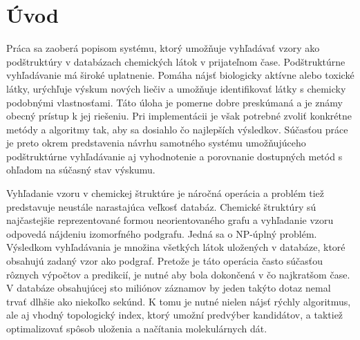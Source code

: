 \documentclass[slovak]{ExcelAtFIT} %
\affiliation{*%
  \href{mailto:xsevci50@stud.fit.vutbr.cz}{xsevci50@stud.fit.vutbr.cz},
  \textit{Faculty of Information Technology, Brno University of Technology}}
\begin{document}
\startdocument



\section{Úvod}
Práca sa zaoberá popisom systému, ktorý umožňuje vyhľadávať vzory ako podštruktúry v databázach chemických látok v prijateľnom čase. Podštruktúrne vy\-hľa\-dá\-va\-nie má široké uplatnenie. Pomáha nájsť biologicky aktívne alebo toxické látky, urýchľuje výskum nových liečiv a umožňuje identifikovať látky s chemicky podobnými vlastnosťami. Táto úloha je pomerne dobre preskúmaná a je známy obecný prístup k jej riešeniu. Pri implementácii je však potrebné zvoliť konkrétne metódy a algoritmy tak, aby sa dosiahlo čo najlepších výsledkov. Súčasťou práce je preto okrem predstavenia návrhu samotného systému umožňujúceho podštruktúrne vy\-hľa\-dá\-va\-nie aj vyhodnotenie a porovnanie dostupných metód s ohľadom na súčasný stav výskumu.

Vyhľadanie vzoru v chemickej štruktúre je náročná operácia a problém tiež predstavuje neustále narastajúca veľkosť databáz. Chemické štruktúry sú najčastejšie reprezentované formou neorientovaného grafu a vyhľadanie vzoru odpovedá nájdeniu izomorfného podgrafu. Jedná sa o NP-úplný problém. Výsledkom vyhľadávania je množina všetkých látok uložených v databáze, ktoré obsahujú zadaný vzor ako podgraf. Pretože je táto operácia často súčasťou rôznych výpočtov a predikcií, je nutné aby bola dokončená v čo najkratšom čase. V databáze obsahujúcej sto miliónov záznamov by jeden takýto dotaz nemal trvať dlhšie ako niekoľko sekúnd. K tomu je nutné nielen nájsť rýchly algoritmus, ale aj vhodný topologický index, ktorý umožní predvýber kandidátov, a taktiež optimalizovať spôsob uloženia a načítania molekulárnych dát.
\end{document}

